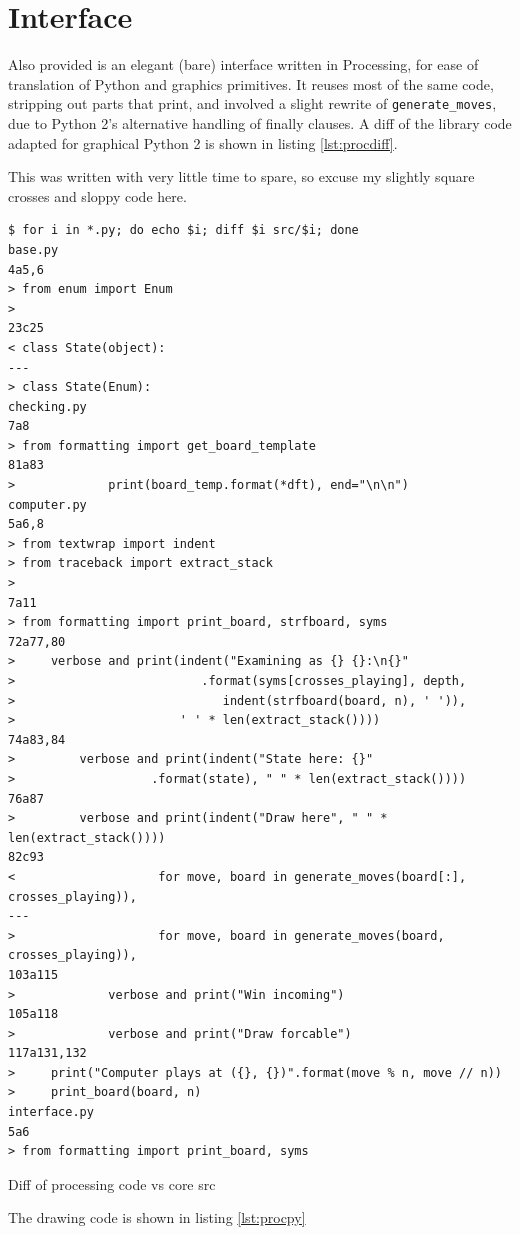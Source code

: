 \documentclass[fleqn,a4paper,11pt]{article}
\begin{document}
    \section{Interface}

    Also provided is an elegant (bare) interface written in Processing, for ease
    of translation of Python and graphics primitives. It reuses most of the same
    code, stripping out parts that print, and involved a slight rewrite of
    \texttt{generate\_moves}, due to Python 2's alternative handling of finally
    clauses. A diff of the library code adapted for graphical Python 2 is shown
    in listing \ref{lst:procdiff}.

    This was written with very little time to spare, so excuse my slightly
    square crosses and sloppy code here.

\begin{longlisting}
\begin{verbatim}
$ for i in *.py; do echo $i; diff $i src/$i; done
base.py
4a5,6
> from enum import Enum
>
23c25
< class State(object):
---
> class State(Enum):
checking.py
7a8
> from formatting import get_board_template
81a83
>             print(board_temp.format(*dft), end="\n\n")
computer.py
5a6,8
> from textwrap import indent
> from traceback import extract_stack
>
7a11
> from formatting import print_board, strfboard, syms
72a77,80
>     verbose and print(indent("Examining as {} {}:\n{}"
>                          .format(syms[crosses_playing], depth,
>                             indent(strfboard(board, n), ' ')),
>                       ' ' * len(extract_stack())))
74a83,84
>         verbose and print(indent("State here: {}"
>                   .format(state), " " * len(extract_stack())))
76a87
>         verbose and print(indent("Draw here", " " * len(extract_stack())))
82c93
<                    for move, board in generate_moves(board[:], crosses_playing)),
---
>                    for move, board in generate_moves(board, crosses_playing)),
103a115
>             verbose and print("Win incoming")
105a118
>             verbose and print("Draw forcable")
117a131,132
>     print("Computer plays at ({}, {})".format(move % n, move // n))
>     print_board(board, n)
interface.py
5a6
> from formatting import print_board, syms
\end{verbatim}
\caption{Diff of processing code vs core src}\label{lst:procdiff}
\end{longlisting}

    The drawing code is shown in listing \ref{lst:procpy}
\end{document}
